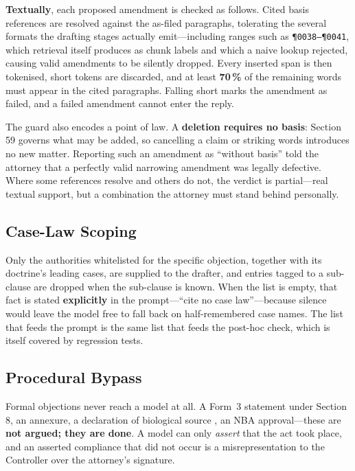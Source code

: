 \documentclass[conference]{IEEEtran}
\newcommand{\code}[1]{\texttt{\small #1}}
\begin{document}
\textbf{Textually}, each proposed amendment is checked as follows. Cited basis references are resolved against the as-filed paragraphs, tolerating the several formats the drafting stages actually emit---including ranges such as \code{\P0038--\P0041}, which retrieval itself produces as chunk labels and which a naive lookup rejected, causing valid amendments to be silently dropped. Every inserted span is then tokenised, short tokens are discarded, and at least \textbf{70\,\%} of the remaining words must appear in the cited paragraphs. Falling short marks the amendment as failed, and a failed amendment cannot enter the reply.

The guard also encodes a point of law. A \textbf{deletion requires no basis}: Section 59 governs what may be added, so cancelling a claim or striking words introduces no new matter. Reporting such an amendment as ``without basis'' told the attorney that a perfectly valid narrowing amendment was legally defective. Where some references resolve and others do not, the verdict is partial---real textual support, but a combination the attorney must stand behind personally.

\subsection{Case-Law Scoping}

Only the authorities whitelisted for the specific objection, together with its doctrine's leading cases, are supplied to the drafter, and entries tagged to a sub-clause are dropped when the sub-clause is known. When the list is empty, that fact is stated \textbf{explicitly} in the prompt---``cite no case law''---because silence would leave the model free to fall back on half-remembered case names. The list that feeds the prompt is the same list that feeds the post-hoc check, which is itself covered by regression tests.

\subsection{Procedural Bypass}

Formal objections never reach a model at all. A Form~3 statement under Section 8, an annexure, a declaration of biological source \cite{bda2002}, an NBA approval---these are \textbf{not argued; they are done}. A model can only \emph{assert} that the act took place, and an asserted compliance that did not occur is a misrepresentation to the Controller over the attorney's signature.
\end{document}
